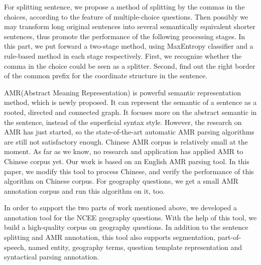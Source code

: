 \documentclass[master, winfont]{njuthesis}
\begin{document}
\begin{englishabstract}
For splitting sentence, we propose a method of splitting by the commas in the choices, according to the feature of multiple-choice questions. Then possibly we may transform long original sentences into several semantically equivalent shorter sentences, thus promote the performance of the following processing stages. In this part, we put forward a two-stage method, using MaxEntropy classifier and a rule-based method in each stage respectively. First, we recognize whether the comma in the choice could be seen as a splitter. Second, find out the right border of the common prefix for the coordinate structure in the sentence.

AMR(Abstract Meaning Representation) is powerful semantic representation method, which is newly proposed. It can represent the semantic of a sentence as a rooted, directed and connected graph. It focuses more on the abstract semantic in the sentence, instead of the superficial syntax style. However, the research on AMR has just started, so the state-of-the-art automatic AMR parsing algorithms are still not satisfactory enough. Chinese AMR corpus is relatively small at the moment. As far as we know, no research and application has applied AMR to Chinese corpus yet. Our work is based on an English AMR parsing tool. In this paper, we modify this tool to process Chinese, and verify the performance of this algorithm on Chinese corpus. For geography questions, we get a small AMR annotation corpus and run this algorithm on it, too.

In order to support the two parts of work mentioned above, we developed a annotation tool for the NCEE geography questions. With the help of this tool, we build a high-quality corpus on geography questions. In addition to the sentence splitting and AMR annotation, this tool also supports segmentation, part-of-speech, named entity, geography terms, question template representation and syntactical parsing annotation.

\end{englishabstract}

%
%
\end{document}
